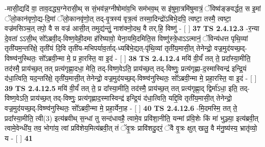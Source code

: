 \documentclass[17pt]{extarticle}
\begin{document}
                  -मासी॒द्यदि॑ वा॒ ताव॒दद्ध्य॒ग्नेरासी॒थ् स सं॒भव॑न्न॒ग्नीषोमा॑व॒भि सम॑भव॒थ् स इ॑षुमा॒त्रमि॑षुमात्रं॒ ॅविष्व॑ङ्ङवर्द्धत॒ स इ॒मां ॅलो॒कान॑वृणो॒द्य-दि॒मां ॅलो॒कानवृ॑णो॒त् तद्-वृ॒त्रस्य॑ वृत्र॒त्वं तस्मा॒दिन्द्रो॑ऽबिभे॒दपि॒ त्वष्टा॒ तस्मै॒ त्वष्टा॒ वज्र॑मसिञ्च॒त् तपो॒ वै स वज्र॑ आसी॒त् तमुद्य॑न्तुं॒ नाश॑क्नो॒दथ॒ वै तर्.हि॒ विष्णु॑ - [  ] \textbf{  37} \newline
                  \newline
                                \textbf{ TS 2.4.12.3} \newline
                  -र॒न्या दे॒वता॑ ऽऽसी॒थ् सो᳚ऽब्रवी॒द्-विष्ण॒वेही॒दमा ह॑रिष्यावो॒ येना॒यमि॒दमिति॒स विष्णु॑स्त्रे॒धाऽऽत्मानं॒ ॅविन्य॑धत्त पृथि॒व्यां तृती॑यम॒न्तरि॑क्षे॒ तृती॑यं दि॒वि तृती॑य-मभिपर्याव॒र्ताद्-ध्यबि॑भे॒द्यत्-पृ॑थि॒व्यां तृती॑य॒मासी॒त् तेनेन्द्रो॒ वज्र॒मुद॑यच्छ॒द्-विष्ण्व॑नुस्थितः॒ सो᳚ऽब्रवी॒न्मा मे॒ प्र हा॒रस्ति॒ वा इ॒दं - [  ] \textbf{  38} \newline
                  \newline
                                \textbf{ TS 2.4.12.4} \newline
                  मयि॑ वी॒र्यं॑ तत् ते॒ प्रदा᳚स्या॒मीति॒ तद॑स्मै॒ प्राय॑च्छ॒त् तत् प्रत्य॑गृह्णा॒दधा॒ मेति॒ तद्-विष्ण॒वेऽति॒ प्राय॑च्छ॒त् तद्-विष्णुः॒ प्रत्य॑गृह्णा-द॒स्मास्विन्द्र॑ इन्द्रि॒यं द॑धा॒त्विति॒ यद॒न्तरि॑क्षे॒ तृती॑य॒मासी॒त् तेनेन्द्रो॒ वज्र॒मुद॑यच्छ॒द्-विष्ण्व॑नुस्थितः॒ सो᳚ऽब्रवी॒न्मा मे॒ प्रहा॒रस्ति॒ वा इ॒दं - [  ] \textbf{  39} \newline
                  \newline
                                \textbf{ TS 2.4.12.5} \newline
                  मयि॑ वी॒र्यं॑ तत् ते॒ प्र दा᳚स्या॒मीति॒ तद॑स्मै॒ प्राय॑च्छ॒त् तत् प्रत्य॑गृह्णा॒द् द्विर्मा॑ऽधा॒ इति॒ तद्-विष्ण॒वेऽति॒ प्राय॑च्छ॒त् तद्-विष्णुः॒ प्रत्य॑गृह्णाद॒स्मास्विन्द्र॑ इन्द्रि॒यं द॑धा॒त्विति॒ यद्दि॒वि तृती॑य॒मासी॒त् तेनेन्द्रो॒ वज्र॒मुद॑यच्छ॒द्-विष्ण्व॑नुस्थितः॒ सो᳚ऽब्रवी॒न्मा मे॒ प्रहा॒र्येना॒ह - [  ] \textbf{  40} \newline
                  \newline
                                \textbf{ TS 2.4.12.6} \newline
                  -मि॒दमस्मि॒ तत् ते॒ प्रदा᳚स्या॒मीति॒ त्वी(3) इत्य॑ब्रवीथ् स॒न्धां तु सन्द॑धावहै॒ त्वामे॒व प्रवि॑शा॒नीति॒ यन्मां प्र॑वि॒शेः किं मा॑ भुञ्ज्या॒ इत्य॑ब्रवी॒त् त्वामे॒वेन्धी॑य॒ तव॒ भोगा॑य॒ त्वां प्रवि॑शेय॒मित्य॑ब्रवी॒त् तं ॅवृ॒त्रः प्रावि॑शदु॒दरं॒ ॅवै वृ॒त्रः क्षुत् खलु॒ वै म॑नु॒ष्य॑स्य॒ भ्रातृ॑व्यो॒ य - [  ] \textbf{  41} \newline
\end{document}

